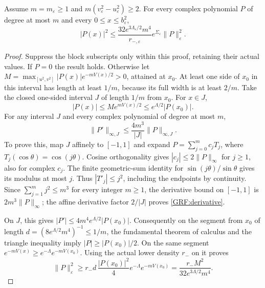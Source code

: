 \documentclass[11pt,a4paper]{article}
\begin{document}
\begin{grflemma}\label{GRF:evaluation}
Assume $m=m_\varepsilon\ge1$ and
$m(v_\varepsilon^2-u_\varepsilon^2)\ge2$. For every complex polynomial
$P$ of degree at most $m$ and every $0\le x\le b_\varepsilon^2$,
\begin{equation*}\tag{GRF14}\label{GRF:evalbound}
 |P(x)|^2\le
 \frac{32e^{3\Lambda_\varepsilon/2}m^4}{r_{-,\varepsilon}}
 e^{\Sigma_\varepsilon}\|P\|_\varepsilon^2.
\end{equation*}
\end{grflemma}
\begin{proof}
Suppress the block subscripts only within this proof, retaining their
actual values. If $P=0$ the result holds. Otherwise let
$M=\max_{[u^2,v^2]}|P(x)|e^{-mV(x)/2}>0$, attained at $x_0$.
At least one side of $x_0$ in this interval has length at least $1/m$,
because its full width is at least $2/m$. Take the closed one-sided
interval $J$ of length $1/m$ from $x_0$. For $x\in J$,
\[
 |P(x)|\le M e^{mV(x)/2}
 \le e^{\Lambda/2}|P(x_0)|.
\]
For any interval $J$ and every complex polynomial of degree at most $m$,
\begin{equation*}\tag{GRF15}\label{GRF:derivative}
 \|P'\|_{\infty,J}\le\frac{4m^3}{|J|}\|P\|_{\infty,J}.
\end{equation*}
To prove this, map $J$ affinely to $[-1,1]$ and expand
$P=\sum_{j=0}^m c_jT_j$, where $T_j(\cos\theta)=\cos(j\theta)$.
Cosine orthogonality gives $|c_j|\le2\|P\|_\infty$ for $j\ge1$,
also for complex $c_j$. The finite geometric-sum identity for
$\sin(j\theta)/\sin\theta$ gives its modulus at most $j$.
Thus $|T'_j|\le j^2$, including the endpoints by continuity.
Since $\sum_{j=1}^m j^2\le m^3$ for every integer $m\ge1$,
the derivative bound on $[-1,1]$ is $2m^3\|P\|_\infty$;
the affine derivative factor $2/|J|$ proves \eqref{GRF:derivative}.

On $J$, this gives
$|P'|\le4m^4 e^{\Lambda/2}|P(x_0)|$.
Consequently on the segment from $x_0$ of length
$d=(8e^{\Lambda/2}m^4)^{-1}\le1/m$, the fundamental theorem of calculus
and the triangle inequality imply $|P|\ge|P(x_0)|/2$.
On the same segment $e^{-mV(x)}\ge e^{-\Lambda}e^{-mV(x_0)}$.
Using the actual lower density $r_-$ on it proves
\[
 \|P\|_\varepsilon^2\ge
 r_-d\,\frac{|P(x_0)|^2}{4}e^{-\Lambda}e^{-mV(x_0)}
 =\frac{r_-M^2}{32e^{3\Lambda/2}m^4}.
\]


\end{proof}
\end{document}
